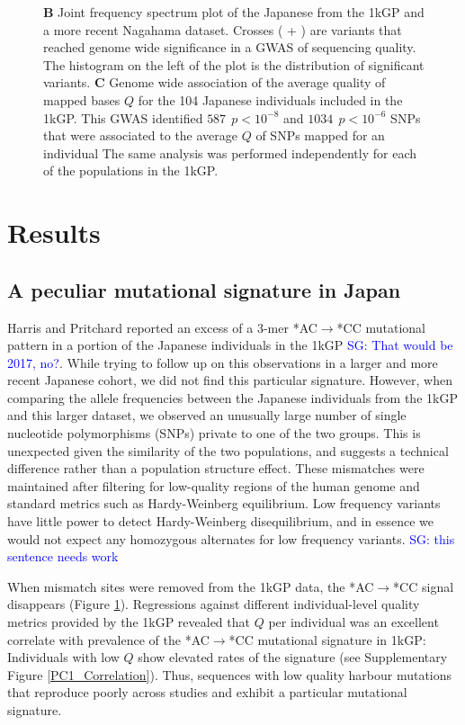 \documentclass[9pt,lineno]{elife}
\newcommand{\sgcomment}[1]{\textcolor{blue}{SG: #1}}
\begin{document}
\begin{figure}
{\textbf{B} 
Joint frequency spectrum plot of the Japanese from the 1kGP and a more recent Nagahama dataset.
Crosses ( + ) are variants that reached genome wide significance in a GWAS of sequencing quality. 
The histogram on the left of the plot is the distribution of significant variants. 
\textbf{C} 
Genome wide association of the average quality of mapped bases $Q$ for the 104 Japanese individuals included in the 1kGP. This GWAS identified $587\ \  p < 10^{-8}$ and $1034\ \ p < 10^{-6}$ SNPs that were associated to the average $Q$ of SNPs mapped for an individual
The same analysis was performed independently for each of the populations in the 1kGP. }
 \label{SFS}
\end{figure}


\section{Results}

			
\subsection{A peculiar mutational signature in Japan}			
	
Harris and Pritchard reported an excess of a 3-mer *AC${\rightarrow}$*CC mutational pattern in a portion of the Japanese individuals in the 1kGP \citep{Harris2015a} \sgcomment{That would be 2017, no?}.
While trying to follow up on this observations in a larger and more recent Japanese cohort, we did not find this particular signature.
However, when comparing the allele frequencies between the Japanese individuals from the 1kGP and this larger dataset, we observed an unusually large number of single nucleotide polymorphisms (SNPs) private to one of the two groups.
This is unexpected given the similarity of the two populations, and suggests a technical difference rather than a population structure effect. 
These mismatches were maintained after filtering for low-quality regions of the human genome and standard metrics such as Hardy-Weinberg equilibrium.
Low frequency variants have little power to detect Hardy-Weinberg disequilibrium, and in essence we would not expect any homozygous alternates for low frequency variants. \sgcomment{this sentence needs work}

When mismatch sites were removed from the 1kGP data, the  *AC${\rightarrow}$*CC signal disappears (Figure \ref{SFS}).
Regressions against different individual-level quality metrics provided by the 1kGP revealed that $Q$ per individual was an excellent correlate with prevalence of the  *AC${\rightarrow}$*CC mutational signature in 1kGP:
Individuals with low $Q$ show elevated rates of the signature (see Supplementary Figure \ref{PC1_Correlation}).
Thus, sequences with low quality harbour mutations that reproduce poorly across studies and exhibit a particular mutational signature. 
\end{document}
